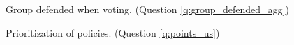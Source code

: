 \begin{figure}[h!]
    \caption{Group defended when voting. (Question \ref{q:group_defended_agg})}\label{fig:group_defended_agg2}
\end{figure}


\begin{figure}[h!] %
    \caption{Prioritization of policies. (Question \ref{q:points_us})}\label{fig:points_us}
\end{figure}


